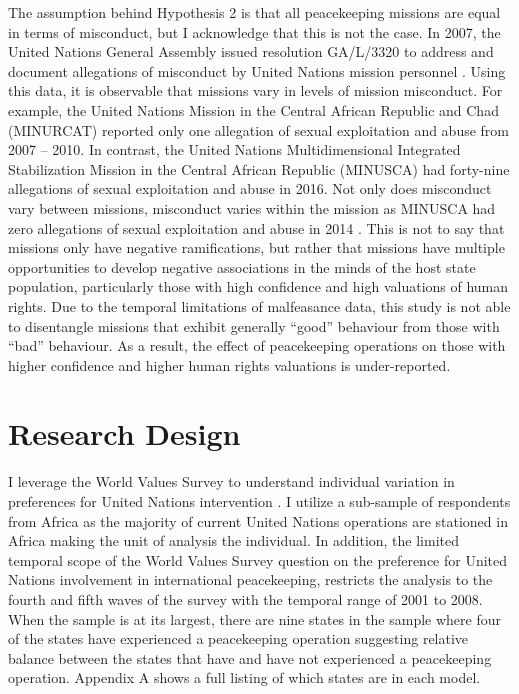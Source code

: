 \documentclass[12pt]{article}
\newcommand{\UN}[1]{United Nations}
\newcommand{\PKO}[1]{peacekeeping operation}
\newcommand{\PKOs}[1]{peacekeeping operations}
\begin{document}
The assumption behind Hypothesis 2 is that all peacekeeping missions are equal in terms of misconduct, but I acknowledge that this is not the case. In 2007, the United Nations General Assembly issued resolution GA/L/3320 to address and document allegations of misconduct by \UN{} mission personnel \citep{UN_Res}\footnotemark[4]. Using this data, it is observable that missions vary in levels of mission misconduct. For example, the United Nations Mission in the Central African Republic and Chad (MINURCAT) reported only one allegation of sexual exploitation and abuse from 2007 – 2010. In contrast, the United Nations Multidimensional Integrated Stabilization Mission in the Central African Republic (MINUSCA) had forty-nine allegations of sexual exploitation and abuse in 2016. Not only does misconduct vary between missions, misconduct varies within the mission as MINUSCA had zero allegations of sexual exploitation and abuse in 2014 \citep{PKAT}. This is not to say that missions only have negative ramifications, but rather that missions have multiple opportunities to develop negative associations in the minds of the host state population, particularly those with high confidence and high valuations of human rights. Due to the temporal limitations of malfeasance data, this study is not able to disentangle missions that exhibit generally ``good” behaviour from those with ``bad” behaviour. As a result, the effect of \PKOs{} on those with higher confidence and higher human rights valuations is under-reported.


\section*{Research Design}

I leverage the World Values Survey to understand individual variation in preferences for \UN{} intervention \citep{inglehart2014world}. I utilize a sub-sample of respondents from Africa as the majority of current \UN{} operations are stationed in Africa \citep{united_nations_2021,fjelde2019protection} making the unit of analysis the individual. In addition, the limited temporal scope of the World Values Survey question on the preference for \UN{} involvement in international peacekeeping, restricts the analysis to the fourth and fifth waves of the survey with the temporal range of 2001 to 2008. When the sample is at its largest, there are nine states in the sample where four of the states have experienced a \PKO{} suggesting relative balance between the states that have and have not experienced a \PKO{}. Appendix A shows a full listing of which states are in each model.
\end{document}
